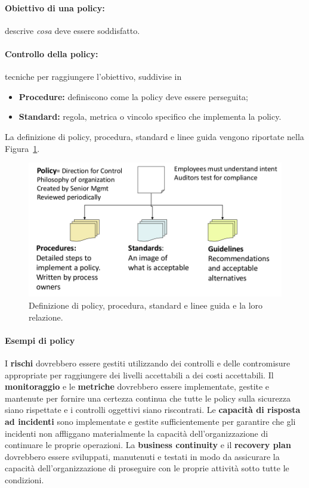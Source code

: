 \paragraph*{Obiettivo di una policy:} descrive \textit{cosa} deve essere
soddisfatto.

\paragraph*{Controllo della policy:} tecniche per raggiungere l'obiettivo,
suddivise in
\begin{itemize}
  \item \textbf{Procedure:} definiscono come la policy deve essere perseguita;
  \item \textbf{Standard:} regola, metrica o vincolo specifico che implementa
  la policy.
\end{itemize}

La definizione di policy, procedura, standard e linee guida vengono
riportate nella Figura~\ref{fig:doc:policy}.


\begin{figure}[h!]
        \begin{center}
                \includegraphics[scale=0.4]{res/img/documentation_policy}
        \end{center}
        \caption{Definizione di policy, procedura, standard e linee
        guida e la loro relazione.}
        \label{fig:doc:policy}
\end{figure}

\paragraph*{Esempi di policy}

I \textbf{rischi} dovrebbero essere gestiti utilizzando dei controlli e delle
contromisure appropriate per raggiungere dei livelli accettabili a dei costi
accettabili. Il \textbf{monitoraggio} e le \textbf{metriche} dovrebbero essere
implementate, gestite e mantenute per fornire una certezza continua che tutte
le policy sulla sicurezza siano rispettate e i controlli oggettivi siano
riscontrati. Le \textbf{capacità di risposta ad incidenti} sono implementate e
gestite sufficientemente per garantire che gli incidenti non affliggano
materialmente la capacità dell'organizzazione di continuare le proprie
operazioni.
La \textbf{business continuity} e il \textbf{recovery plan} dovrebbero essere
sviluppati, manutenuti e testati in modo da assicurare la capacità
dell'organizzazione di proseguire con le proprie attività sotto tutte le
condizioni.


